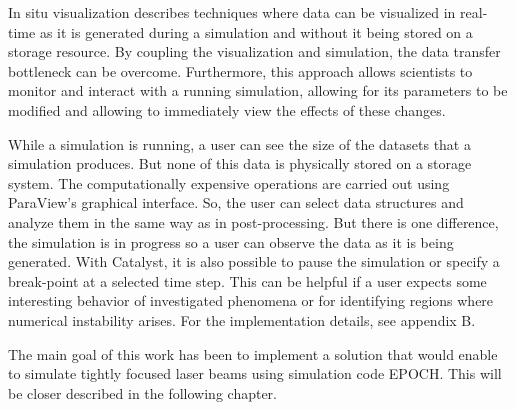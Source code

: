 In situ visualization describes techniques where data can be visualized in real-time as it is generated during a simulation and without it being stored on a storage resource. By coupling the visualization and simulation, the data transfer bottleneck can be overcome. Furthermore, this approach allows scientists to monitor and interact with a running simulation, allowing for its parameters to be modified and allowing to immediately view the effects of these changes.

While a simulation is running, a user can see the size of the datasets that a simulation produces. But none of this data is physically stored on a storage system. The computationally expensive operations are carried out using ParaView’s graphical interface. So, the user can select data structures and analyze them in the same way as in post-processing. But there is one difference, the simulation is in progress so a user can observe the data as it is being generated. With Catalyst, it is also possible to pause the simulation or specify a break-point at a selected time step. This can be helpful if a user expects some interesting behavior of investigated phenomena or for identifying regions where numerical instability arises. For the implementation details, see appendix B.

The main goal of this work has been to implement a solution that would enable to simulate tightly focused laser beams using simulation code EPOCH. This will be closer described in the following chapter.

